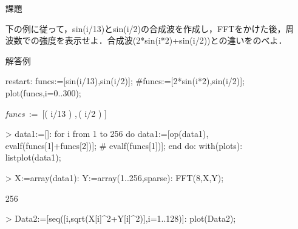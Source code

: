 \begin{itemize}
\item[課題]

下の例に従って，sin(i/13)とsin(i/2)の合成波を作成し，FFTをかけた後，周波数での強度を表示せよ．合成波(2*sin(i*2)+sin(i/2))との違いをのべよ．
\item[解答例]

\begin{MapleInput}
restart:
funcs:=[sin(i/13),sin(i/2)];
#funcs:=[2*sin(i*2),sin(i/2)];
plot(funcs,i=0..300);
\end{MapleInput}
\begin{MapleOutput}
{\it funcs}\, := \,[\sin \left( i/13 \right) ,\,\sin \left( i/2 \right) ]
\end{MapleOutput}

\begin{MapleInput}
> data1:=[]:
for i from 1 to 256 do
  data1:=[op(data1),
   evalf(funcs[1]+funcs[2])]; 
#   evalf(funcs[1])]; 
end do:
with(plots): 
listplot(data1);
\end{MapleInput}

\begin{MapleInput}
> X:=array(data1): 
Y:=array(1..256,sparse):
FFT(8,X,Y);
\end{MapleInput}
\begin{MapleOutput}
256
\end{MapleOutput}

\begin{MapleInput}
> Data2:=[seq([i,sqrt(X[i]^2+Y[i]^2)],i=1..128)]:
plot(Data2);
\end{MapleInput}
\begin{MapleOutput}
\end{MapleOutput}

\end{itemize}
